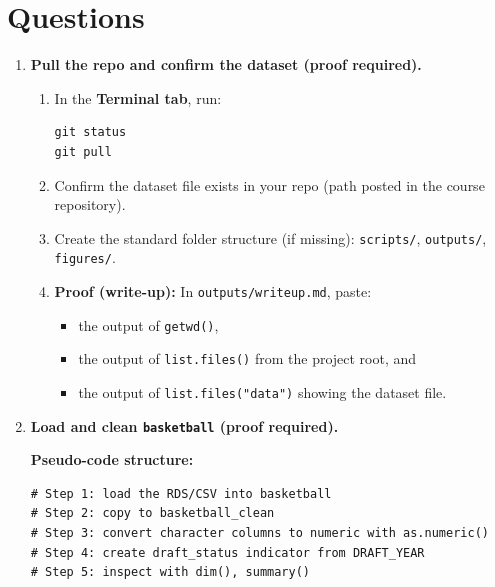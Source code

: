 \documentclass[11pt]{article}
\begin{document}
\section*{Questions}

\begin{enumerate}

  \item \textbf{Pull the repo and confirm the dataset (proof required).}
  \begin{enumerate}
    \item In the \textbf{Terminal tab}, run:
\begin{verbatim}
git status
git pull
\end{verbatim}
    \item Confirm the dataset file exists in your repo (path posted in the course repository).
    \item Create the standard folder structure (if missing): \texttt{scripts/}, \texttt{outputs/}, \texttt{figures/}.
    \item \textbf{Proof (write-up):} In \texttt{outputs/writeup.md}, paste:
    \begin{itemize}
      \item the output of \texttt{getwd()},
      \item the output of \texttt{list.files()} from the project root, and
      \item the output of \texttt{list.files("data")} showing the dataset file.
    \end{itemize}
  \end{enumerate}

  \item \textbf{Load and clean \texttt{basketball} (proof required).}

  \textbf{Pseudo-code structure:}
\begin{verbatim}
# Step 1: load the RDS/CSV into basketball
# Step 2: copy to basketball_clean
# Step 3: convert character columns to numeric with as.numeric()
# Step 4: create draft_status indicator from DRAFT_YEAR
# Step 5: inspect with dim(), summary()
\end{verbatim}


\end{enumerate}
\end{document}
